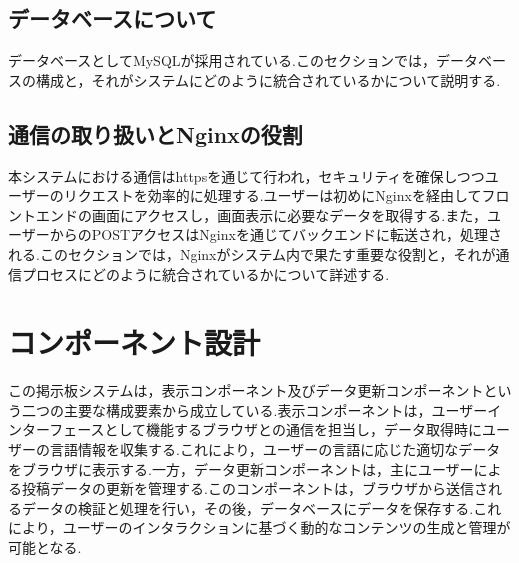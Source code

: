 \documentclass[b5paper,12pt,dvipdfmx]{jsreport}
\begin{document}
\subsection{データベースについて}
データベースとしてMySQLが採用されている.このセクションでは，データベースの構成と，それがシステムにどのように統合されているかについて説明する.


\subsection{通信の取り扱いとNginxの役割}
本システムにおける通信はhttpsを通じて行われ，セキュリティを確保しつつユーザーのリクエストを効率的に処理する.ユーザーは初めにNginxを経由してフロントエンドの画面にアクセスし，画面表示に必要なデータを取得する.また，ユーザーからのPOSTアクセスはNginxを通じてバックエンドに転送され，処理される.このセクションでは，Nginxがシステム内で果たす重要な役割と，それが通信プロセスにどのように統合されているかについて詳述する.


\section{コンポーネント設計}
この掲示板システムは，表示コンポーネント及びデータ更新コンポーネントという二つの主要な構成要素から成立している.表示コンポーネントは，ユーザーインターフェースとして機能するブラウザとの通信を担当し，データ取得時にユーザーの言語情報を収集する.これにより，ユーザーの言語に応じた適切なデータをブラウザに表示する.一方，データ更新コンポーネントは，主にユーザーによる投稿データの更新を管理する.このコンポーネントは，ブラウザから送信されるデータの検証と処理を行い，その後，データベースにデータを保存する.これにより，ユーザーのインタラクションに基づく動的なコンテンツの生成と管理が可能となる.


\end{document}
